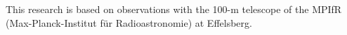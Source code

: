 \documentclass[a4paper,11pt]{article}
\begin{document}
\acknowledgments
\noindent
This research is based on observations with the 100-m telescope of the MPIfR (Max-Planck-Institut für Radioastronomie) at Effelsberg. 



\end{document}
